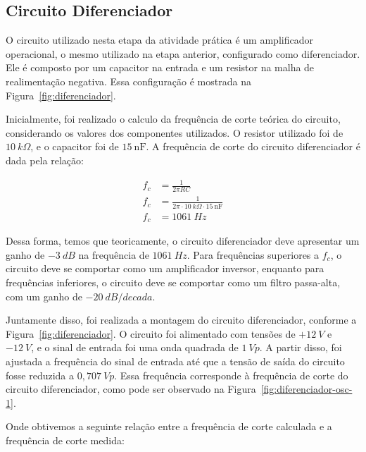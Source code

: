 \subsection{Circuito Diferenciador}

O circuito utilizado nesta etapa da atividade prática é um amplificador operacional, o mesmo utilizado na etapa anterior, configurado como diferenciador. Ele é composto por um capacitor na entrada e um resistor na malha de realimentação negativa. Essa configuração é mostrada na Figura~\ref{fig:diferenciador}.


Inicialmente, foi realizado o calculo da frequência de corte teórica do circuito, considerando os valores dos componentes utilizados. O resistor utilizado foi de $10~k\Omega$, e o capacitor foi de $15~\si{\nano\farad}$. A frequência de corte do circuito diferenciador é dada pela relação:

\begin{align}
    f_c &= \frac{1}{2 \pi R C} \\
    f_c &= \frac{1}{2 \pi \cdot 10~k\Omega \cdot 15~\si{\nano\farad}} \\
    f_c &= 1061~Hz
\end{align}

Dessa forma, temos que teoricamente, o circuito diferenciador deve apresentar um ganho de $-3~dB$ na frequência de $1061~Hz$. Para frequências superiores a $f_c$, o circuito deve se comportar como um amplificador inversor, enquanto para frequências inferiores, o circuito deve se comportar como um filtro passa-alta, com um ganho de $-20~dB/decada$.

Juntamente disso, foi realizada a montagem do circuito diferenciador, conforme a Figura~\ref{fig:diferenciador}. O circuito foi alimentado com tensões de $+12~V$ e $-12~V$, e o sinal de entrada foi uma onda quadrada de $1~Vp$. A partir disso, foi ajustada a frequência do sinal de entrada até que a tensão de saída do circuito fosse reduzida a $0,707~Vp$. Essa frequência corresponde à frequência de corte do circuito diferenciador, como pode ser observado na Figura~\ref{fig:diferenciador-osc-1}.


Onde obtivemos a seguinte relação entre a frequência de corte calculada e a frequência de corte medida:

